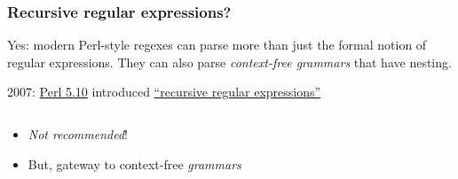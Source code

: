\begin{frame}[fragile]
  \frametitle{Recursive regular expressions?}

  Yes: modern Perl-style regexes can parse more than just the formal notion of regular expressions. They can also parse \emph{context-free grammars} that have nesting.

  2007: \href{http://dev.perl.org/perl5/news/2007/perl-5.10.0.html}{Perl 5.10} introduced \href{http://www.catonmat.net/blog/recursive-regular-expressions/}{``recursive regular expressions''}

  \inputminted{perl}{extra/parens.pl}

  \begin{itemize}
    \item \emph{Not recommended}!
    \item But, gateway to context-free \emph{grammars}
  \end{itemize}
\end{frame}
